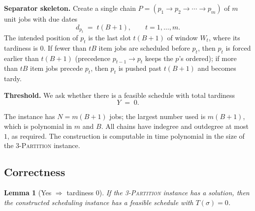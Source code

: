 \documentclass{amsart}
\newtheorem{lemma}{Lemma}
\theoremstyle{definition}
\theoremstyle{remark}
\begin{document}
\medskip
\noindent\textbf{Separator skeleton.} Create a single chain
$P=(p_1\to p_2\to\cdots\to p_m)$ of $m$ unit jobs with due dates
\[
   d_{p_t} \;=\; t(B+1),\qquad t=1,\dots,m .
\]
The intended position of $p_t$ is the last slot $t(B+1)$ of window $W_t$, where its
tardiness is $0$. If fewer than $tB$ item jobs are scheduled before $p_t$, then $p_t$ is
forced earlier than $t(B+1)$ (precedence $p_{t-1}\to p_t$ keeps the $p$'s ordered); if
more than $tB$ item jobs precede $p_t$, then $p_t$ is pushed past $t(B+1)$ and becomes
tardy.

\medskip
\noindent\textbf{Threshold.} We ask whether there is a feasible schedule with total
tardiness
\[
   Y \;=\; 0 .
\]

The instance has $N=m(B+1)$ jobs; the largest number used is $m(B+1)$, which is
polynomial in $m$ and $B$. All chains have indegree and outdegree at most $1$, as
required. The construction is computable in time polynomial in the size of the
\textsc{3-Partition} instance.

\subsection*{Correctness}

\begin{lemma}[Yes $\Rightarrow$ tardiness $0$]\label{lem:yes}
If the \textsc{3-Partition} instance has a solution, then the constructed scheduling
instance has a feasible schedule with $T(\sigma)=0$.
\end{lemma}
\end{document}
